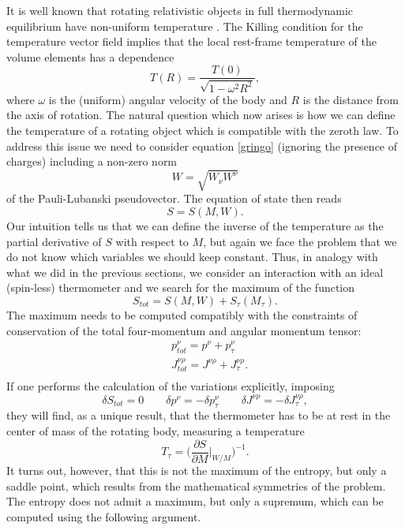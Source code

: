 \documentclass[twocolumn,usenatbib]{mnras2}
\begin{document}
It is well known that rotating relativistic objects in full thermodynamic equilibrium have non-uniform temperature \cite{cercignani_book}. The Killing condition for the temperature vector field implies that the local rest-frame temperature of the volume elements has a dependence
\begin{equation}
T(R) = \dfrac{T(0)}{\sqrt{1-\omega^2 R^2}},
\end{equation}
where $\omega$ is the (uniform) angular velocity of the body and $R$ is the distance from the axis of rotation. The natural question which now arises is how we can define the temperature of a rotating object which is compatible with the zeroth law. To address this issue we need to consider equation \eqref{gringo} (ignoring the presence of charges) including a non-zero norm
\begin{equation}
W = \sqrt{W_\nu W^\nu}
\end{equation} 
of the Pauli-Lubanski pseudovector. The equation of state then reads
\begin{equation}
S=S(M,W).
\end{equation}
Our intuition tells us that we can define the inverse of the temperature as the partial derivative of $S$ with respect to $M$, but again we face the problem that we do not know which variables we should keep constant. Thus, in analogy with what we did in the previous sections, we consider an interaction with an ideal (spin-less) thermometer and we search for the maximum of the function
\begin{equation}
S_{tot} =S(M,W) + S_\tau (M_\tau). 
\end{equation}
The maximum needs to be computed compatibly with the constraints of conservation of the total four-momentum and angular momentum tensor:
\begin{equation}
\begin{split}
& p_{tot}^\nu = p^\nu + p_\tau^\nu \\
& J_{tot}^{\nu \rho} = J^{\nu \rho} + J_\tau^{\nu \rho}. \\
\end{split}
\end{equation} 
If one performs the calculation of the variations explicitly, imposing
\begin{equation}
\delta S_{tot}=0  \quad \quad \delta p^\nu =-\delta p_\tau^\nu \quad \quad \delta J^{\nu \rho} = -\delta J_\tau^{\nu \rho},  
\end{equation}
they will find, as a unique result, that the thermometer has to be at rest in the center of mass of the rotating body, measuring a temperature
\begin{equation}\label{Saddle}
T_\tau = \bigg(\dfrac{\partial S}{\partial M} \bigg|_{W/M} \bigg)^{-1}.
\end{equation}
It turns out, however, that this is not the maximum of the entropy, but only a saddle point, which results from the mathematical symmetries of the problem. The entropy does not admit a maximum, but only a supremum, which can be computed using the following argument. 
\end{document}

